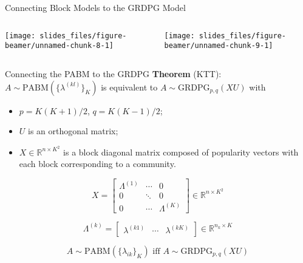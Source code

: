 \documentclass[
  ignorenonframetext,
]{beamer}
\providecommand{\tightlist}{%
  \setlength{\itemsep}{0pt}\setlength{\parskip}{0pt}}
\begin{document}
\begin{frame}{Connecting Block Models to the GRDPG Model}
\protect\hypertarget{connecting-block-models-to-the-grdpg-model-2}{}
\begin{columns}[T]
\begin{column}{0.48\textwidth}
\begin{center}\texttt{[image: slides\_files/figure-beamer/unnamed-chunk-8-1]} \end{center}
\end{column}

\begin{column}{0.48\textwidth}
\vspace*{0\baselineskip}

\begin{center}\texttt{[image: slides\_files/figure-beamer/unnamed-chunk-9-1]} \end{center}
\end{column}
\end{columns}
\end{frame}

\begin{frame}{Connecting the PABM to the GRDPG}
\protect\hypertarget{connecting-the-pabm-to-the-grdpg}{}
\textbf{Theorem} (KTT): \(A \sim \text{PABM}(\{\lambda^{(kl)}\}_K)\) is
equivalent to \(A \sim \text{GRDPG}_{p, q}(X U)\) with

\begin{itemize}
\tightlist
\item
  \(p = K (K + 1) / 2\), \(q = K (K - 1) / 2\);
\item
  \(U\) is an orthogonal matrix;
\item
  \(X \in \mathbb{R}^{n \times K^2}\) is a block diagonal matrix
  composed of popularity vectors with each block corresponding to a
  community.
\end{itemize}

\[X = \begin{bmatrix}
\Lambda^{(1)} & \cdots & 0 \\
0 & \ddots & 0 \\
0 & \cdots & \Lambda^{(K)}
\end{bmatrix} 
\in \mathbb{R}^{n \times K^2}\]

\[\Lambda^{(k)} = \begin{bmatrix} 
\lambda^{(k1)} & \cdots & \lambda^{(kK)} 
\end{bmatrix} 
\in \mathbb{R}^{n_k \times K}\]

\[A \sim \text{PABM}(\{\lambda_{ik}\}_K) \text{ iff } A \sim \text{GRDPG}_{p, q}(X U)\]
\end{frame}
\end{document}
